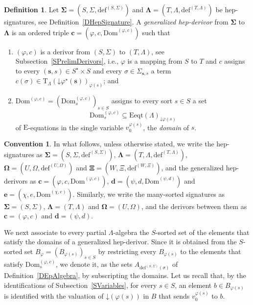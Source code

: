 \documentclass[a4paper, reqno
]{amsart}
\newcommand{\vs}[1]{\mathbin{\downarrow}#1}
\newcommand{\sig}[1]{\mathbf{#1}}             %
\newcommand{\Dom}{\mathrm{Dom}}
\theoremstyle{plain}
\theoremstyle{definition}
\newtheorem{definition}[theorem]{Definition}
\newtheorem*{convention}{Convention}
\begin{document}
\begin{definition}\label{DGenHepDerivor}
Let $\sig{\Sigma}=(S,\Sigma,\mathrm{def}^{(S,\Sigma)})$ and $\sig{\Lambda}=(T,\Lambda,\mathrm{def}^{(T,\Lambda)})$ be hep-signatures, see Definition~\ref{DHepSignature}.
A \emph{generalized hep-derivor} from $\sig{\Sigma}$ to $\sig{\Lambda}$ is an ordered triple $\mathbf{c}=(\varphi,c,\Dom^{(\varphi,c)})$ such that
\begin{enumerate}
\item $(\varphi,c)$ is a derivor from $(S,\Sigma)$ to $(T,\Lambda)$, see Subsection~\ref{SPrelimDerivors}, i.e., $\varphi$ is a mapping from $S$ to $T$ and $c$ assigns to every $(\mathbf{s},s)\in S^{\star}\times S$ and every $\sigma\in\Sigma_{\mathbf{s},s}$ a term $c(\sigma)\in\mathrm{T}_{\Lambda}(\vs{\varphi^{\star}(\mathbf{s})})_{\varphi(s)}$; and
\item $\Dom^{(\varphi,c)}=(\Dom^{(\varphi,c)}_{s})_{s\in S}$ assigns to every sort $s\in S$ a set
$$
\Dom^{(\varphi,c)}_{s}\subseteq\mathrm{Eeqt}(\Lambda)_{\vs{\varphi(s)}}
$$
of $\mathrm{E}$-equations in the single variable $v^{\varphi(s)}_{0}$, the \emph{domain} of $s$.
\end{enumerate}
\end{definition}

\begin{convention}
In what follows, unless otherwise stated, we write the hep-signatures as $\sig{\Sigma}=(S,\Sigma,\mathrm{def}^{(S,\Sigma)})$, $\sig{\Lambda}=(T,\Lambda,\mathrm{def}^{(T,\Lambda)})$, $\sig{\Omega}=(U,\Omega,\mathrm{def}^{(U,\Omega)})$ and $\sig{\Xi}=(W,\Xi,\mathrm{def}^{(W,\Xi)})$, and the generalized hep-derivors as $\mathbf{c}=(\varphi,c,\Dom^{(\varphi,c)})$, $\mathbf{d}=(\psi,d,\Dom^{(\psi,d)})$ and $\mathbf{e}=(\chi,e,\Dom^{(\chi,e)})$.
Similarly, we write the many-sorted signatures as $\sig{\Sigma}=(S,\Sigma)$, $\sig{\Lambda}=(T,\Lambda)$ and $\sig{\Omega}=(U,\Omega)$, and the derivors between them as $\mathbf{c}=(\varphi,c)$ and $\mathbf{d}=(\psi,d)$.
\end{convention}

We next associate to every partial $\Lambda$-algebra the $S$-sorted set of the elements that satisfy the domains of a generalized hep-derivor.
Since it is obtained from the $S$-sorted set $B_{\varphi}=(B_{\varphi(s)})_{s\in S}$ by restricting every $B_{\varphi(s)}$ to the elements that satisfy $\Dom^{(\varphi,c)}_{s}$, we denote it, as the sets $A_{\mathrm{def}^{(S,\Sigma)}(\sigma)}$ of Definition~\ref{DEpAlgebra}, by subscripting the domains.
Let us recall that, by the identifications of Subsection~\ref{SVariables}, for every $s\in S$, an element $b\in B_{\varphi(s)}$ is identified with the valuation of $\vs{(\varphi(s))}$ in $B$ that sends $v^{\varphi(s)}_{0}$ to $b$.
\end{document}
